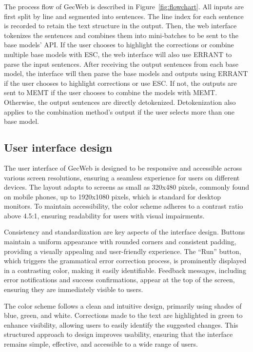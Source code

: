 The process flow of GecWeb is described in Figure~\ref{fig:flowchart}.
All inputs are first split by line and segmented into sentences.
The line index for each sentence is recorded to retain the text structure in the output.
Then, the web interface tokenizes the sentences and combines them into mini-batches to be sent to the base models' API.
If the user chooses to highlight the corrections or combine multiple
base models with ESC, the web interface will also use ERRANT to parse the input sentences.
After receiving the output sentences from each base model, the interface will then parse the base models and outputs using ERRANT if the user chooses to highlight corrections or use ESC.
If not, the outputs are sent to MEMT if the user chooses to combine the models with MEMT.
Otherwise, the output sentences are directly detokenized.
Detokenization also applies to the combination method's output if the user selects more than one base model.

\subsection{User interface design}

The user interface of GecWeb is designed to be responsive and accessible across various screen resolutions, ensuring a seamless experience for users on different devices.
The layout adapts to screens as small as 320x480 pixels, commonly found on mobile phones, up to 1920x1080 pixels, which is standard for desktop monitors.
To maintain accessibility, the color scheme adheres to a contrast ratio above 4.5:1, ensuring readability for users with visual impairments.

Consistency and standardization are key aspects of the interface design.
Buttons maintain a uniform appearance with rounded corners and consistent padding, providing a visually appealing and user-friendly experience.
The ``Run'' button, which triggers the grammatical error correction process, is prominently displayed in a contrasting color, making it easily identifiable.
Feedback messages, including error notifications and success confirmations, appear at the top of the screen, ensuring they are immediately visible to users.

The color scheme follows a clean and intuitive design, primarily using shades of blue, green, and white.
Corrections made to the text are highlighted in green to enhance visibility, allowing users to easily identify the suggested changes.
This structured approach to design improves usability, ensuring that the interface remains simple, effective, and accessible to a wide range of users.

